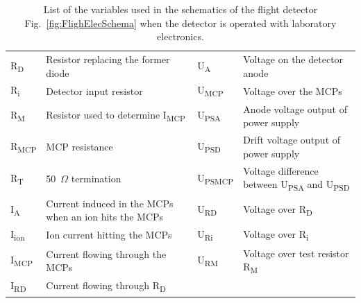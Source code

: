 	\begin{table}[h]
		\begin{center}
		\begin{tabular}{|m{1.5cm}|m{5.4cm}|m{1.5cm}|m{5.4cm}|}
			\hline
			R\textsubscript{D}& Resistor replacing the former diode & U\textsubscript{A}& Voltage on the detector anode \\
			R\textsubscript{i} & Detector input resistor & U\textsubscript{MCP}& Voltage over the MCPs \\
			R\textsubscript{M}& Resistor used to determine I\textsubscript{MCP} &U\textsubscript{PSA} & Anode voltage output of power supply \\
			R\textsubscript{MCP}& MCP resistance & U\textsubscript{PSD} & Drift voltage output of power supply \\
			R\textsubscript{T} & 50~$\Omega$ termination & U\textsubscript{PSMCP} & Voltage difference  between U\textsubscript{PSA} and U\textsubscript{PSD} \\
			I\textsubscript{A} & Current induced in the MCPs when an ion hits the MCPs & U\textsubscript{RD}& Voltage over R\textsubscript{D} \\
			I\textsubscript{ion} & Ion current hitting the MCPs & U\textsubscript{Ri}& Voltage over R\textsubscript{i} \\
			I\textsubscript{MCP} & Current flowing through the MCPs &U\textsubscript{RM}& Voltage over test resistor R\textsubscript{M}\\
			I\textsubscript{RD} & Current flowing through R\textsubscript{D} &&\\
			\hline
		\end{tabular}
		\end{center}
		\caption{List of the variables used in the schematics of the flight detector Fig.~\ref{fig:FlighElecSchema} when the detector is operated with laboratory electronics.}
		\label{tab:ElecSchemaVariableList}
	\end{table}

